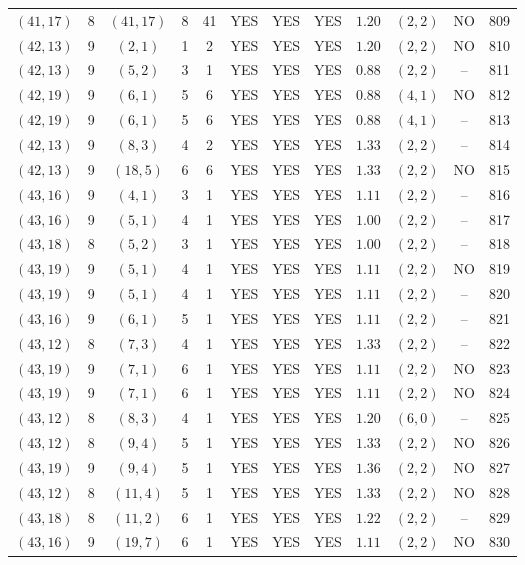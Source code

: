 \begin{longtable}{|c|c|c|c|c|c|c|c|c|c|c|c|}
$(41,17)$ & 8 & $(41,17)$ & 8 & 41 & YES & YES & YES & $1.20$ & $(2,2)$ & NO & 809\\
$(42,13)$ & 9 & $(2,1)$ & 1 & 2 & YES & YES & YES & $1.20$ & $(2,2)$ & NO & 810\\
$(42,13)$ & 9 & $(5,2)$ & 3 & 1 & YES & YES & YES & $0.88$ & $(2,2)$ & -- & 811\\
$(42,19)$ & 9 & $(6,1)$ & 5 & 6 & YES & YES & YES & $0.88$ & $(4,1)$ & NO & 812\\
$(42,19)$ & 9 & $(6,1)$ & 5 & 6 & YES & YES & YES & $0.88$ & $(4,1)$ & -- & 813\\
$(42,13)$ & 9 & $(8,3)$ & 4 & 2 & YES & YES & YES & $1.33$ & $(2,2)$ & -- & 814\\
$(42,13)$ & 9 & $(18,5)$ & 6 & 6 & YES & YES & YES & $1.33$ & $(2,2)$ & NO & 815\\
$(43,16)$ & 9 & $(4,1)$ & 3 & 1 & YES & YES & YES & $1.11$ & $(2,2)$ & -- & 816\\
$(43,16)$ & 9 & $(5,1)$ & 4 & 1 & YES & YES & YES & $1.00$ & $(2,2)$ & -- & 817\\
$(43,18)$ & 8 & $(5,2)$ & 3 & 1 & YES & YES & YES & $1.00$ & $(2,2)$ & -- & 818\\
$(43,19)$ & 9 & $(5,1)$ & 4 & 1 & YES & YES & YES & $1.11$ & $(2,2)$ & NO & 819\\
$(43,19)$ & 9 & $(5,1)$ & 4 & 1 & YES & YES & YES & $1.11$ & $(2,2)$ & -- & 820\\
$(43,16)$ & 9 & $(6,1)$ & 5 & 1 & YES & YES & YES & $1.11$ & $(2,2)$ & -- & 821\\
$(43,12)$ & 8 & $(7,3)$ & 4 & 1 & YES & YES & YES & $1.33$ & $(2,2)$ & -- & 822\\
$(43,19)$ & 9 & $(7,1)$ & 6 & 1 & YES & YES & YES & $1.11$ & $(2,2)$ & NO & 823\\
$(43,19)$ & 9 & $(7,1)$ & 6 & 1 & YES & YES & YES & $1.11$ & $(2,2)$ & NO & 824\\
$(43,12)$ & 8 & $(8,3)$ & 4 & 1 & YES & YES & YES & $1.20$ & $(6,0)$ & -- & 825\\
$(43,12)$ & 8 & $(9,4)$ & 5 & 1 & YES & YES & YES & $1.33$ & $(2,2)$ & NO & 826\\
$(43,19)$ & 9 & $(9,4)$ & 5 & 1 & YES & YES & YES & $1.36$ & $(2,2)$ & NO & 827\\
$(43,12)$ & 8 & $(11,4)$ & 5 & 1 & YES & YES & YES & $1.33$ & $(2,2)$ & NO & 828\\
$(43,18)$ & 8 & $(11,2)$ & 6 & 1 & YES & YES & YES & $1.22$ & $(2,2)$ & -- & 829\\
$(43,16)$ & 9 & $(19,7)$ & 6 & 1 & YES & YES & YES & $1.11$ & $(2,2)$ & NO & 830\\

\end{longtable}
